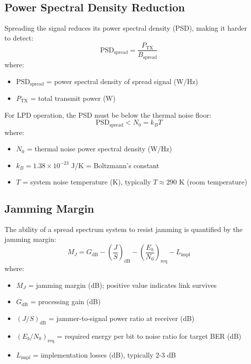 \subsection{Power Spectral Density Reduction}

Spreading the signal reduces its power spectral density (PSD), making it harder to detect:
\begin{equation}
\text{PSD}_{\text{spread}} = \frac{P_{\text{TX}}}{B_{\text{spread}}}
\label{eq:psd-spread}
\end{equation}
where:
\begin{itemize}
\item $\text{PSD}_{\text{spread}}$ = power spectral density of spread signal (W/Hz)
\item $P_{\text{TX}}$ = total transmit power (W)
\end{itemize}

For LPD operation, the PSD must be below the thermal noise floor:
\begin{equation}
\text{PSD}_{\text{spread}} < N_0 = k_B T
\label{eq:lpd-condition}
\end{equation}
where:
\begin{itemize}
\item $N_0$ = thermal noise power spectral density (W/Hz)
\item $k_B = 1.38 \times 10^{-23}$ J/K = Boltzmann's constant
\item $T$ = system noise temperature (K), typically $T \approx 290$ K (room temperature)
\end{itemize}

\subsection{Jamming Margin}

The ability of a spread spectrum system to resist jamming is quantified by the jamming margin:
\begin{equation}
M_J = G_{\text{dB}} - \left(\frac{J}{S}\right)_{\text{dB}} - \left(\frac{E_b}{N_0}\right)_{\text{req}} - L_{\text{impl}}
\label{eq:jamming-margin}
\end{equation}
where:
\begin{itemize}
\item $M_J$ = jamming margin (dB); positive value indicates link survives
\item $G_{\text{dB}}$ = processing gain (dB)
\item $(J/S)_{\text{dB}}$ = jammer-to-signal power ratio at receiver (dB)
\item $(E_b/N_0)_{\text{req}}$ = required energy per bit to noise ratio for target BER (dB)
\item $L_{\text{impl}}$ = implementation losses (dB), typically 2-3 dB
\end{itemize}

